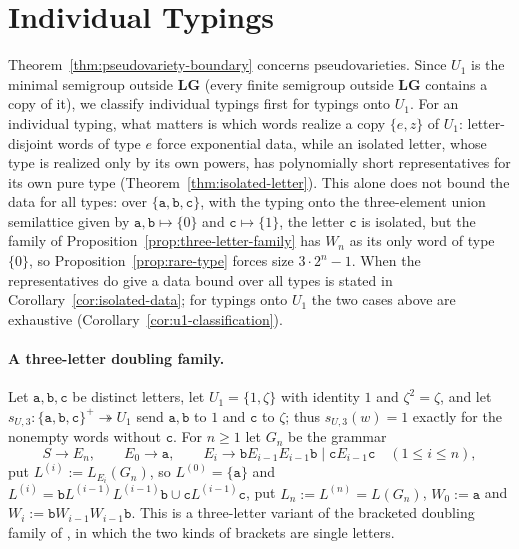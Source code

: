 \documentclass[11pt]{article}
\numberwithin{equation}{section}
\theoremstyle{plain}
\theoremstyle{definition}
\theoremstyle{remark}
\theoremstyle{plain}
\newcommand{\LG}{\mathbf{LG}}
\begin{document}
\section{Individual Typings}
\label{sec:typings}

Theorem~\ref{thm:pseudovariety-boundary} concerns pseudovarieties.  Since $U_1$
is the minimal semigroup outside $\LG$ (every finite semigroup outside $\LG$
contains a copy of it), we classify individual typings first for typings onto
$U_1$.  For an
individual typing, what matters is which words realize a copy $\{e,z\}$ of
$U_1$: letter-disjoint words of type $e$ force exponential data, while an
isolated letter, whose type is realized only by its own powers, has
polynomially short representatives for its own pure type
(Theorem~\ref{thm:isolated-letter}).  This alone does not bound the data for all
types: over $\{\mathtt a,\mathtt b,\mathtt c\}$, with the typing onto the
three-element union semilattice given by $\mathtt a,\mathtt b\mapsto\{0\}$ and
$\mathtt c\mapsto\{1\}$, the letter $\mathtt c$ is isolated, but the family of
Proposition~\ref{prop:three-letter-family} has $W_n$ as its only word of type
$\{0\}$, so Proposition~\ref{prop:rare-type} forces size $3\cdot2^n-1$.  When
the representatives do give a data bound over all types is stated in
Corollary~\ref{cor:isolated-data}; for typings onto $U_1$ the two cases above
are exhaustive (Corollary~\ref{cor:u1-classification}).

\paragraph{A three-letter doubling family.}
Let $\mathtt a,\mathtt b,\mathtt c$ be distinct letters, let $U_1=\{1,\zeta\}$ with
identity $1$ and $\zeta^2=\zeta$, and let
$s_{U,3}:\{\mathtt a,\mathtt b,\mathtt c\}^+\twoheadrightarrow U_1$ send $\mathtt a,\mathtt b$
to $1$ and $\mathtt c$ to $\zeta$; thus $s_{U,3}(w)=1$ exactly for the nonempty words
without $\mathtt c$.  For $n\ge1$ let $G_n$ be the grammar
\[
 S\to E_n,\qquad E_0\to\mathtt a,\qquad
 E_i\to\mathtt bE_{i-1}E_{i-1}\mathtt b\mid\mathtt cE_{i-1}\mathtt c\quad(1\le i\le n),
\]
put $L^{(i)}:=L_{E_i}(G_n)$, so $L^{(0)}=\{\mathtt a\}$ and
$L^{(i)}=\mathtt bL^{(i-1)}L^{(i-1)}\mathtt b\cup\mathtt cL^{(i-1)}\mathtt c$, put
$L_n:=L^{(n)}=L(G_n)$, $W_0:=\mathtt a$ and $W_i:=\mathtt bW_{i-1}W_{i-1}\mathtt b$.
This is a three-letter variant of the bracketed doubling family of
\cite[Proposition~6.4]{kuriyamaCFG}, in which the two kinds of brackets are
single letters.
\end{document}
